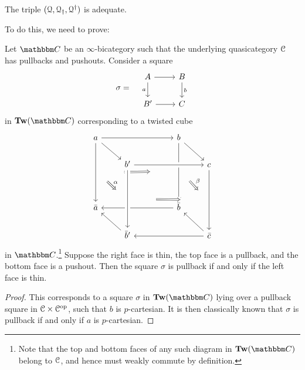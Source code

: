 \documentclass[main.tex]{subfiles}
\begin{document}
\begin{proposition}
  \label{prop:q_triple_is_adequate}
  The triple $(\mathcal{Q}, \mathcal{Q}_{\dagger}, \mathcal{Q}^{\dagger})$ is adequate.
\end{proposition}

To do this, we need to prove:
\begin{lemma}
  \label{lemma:pullbacks_in_ttw}
  Let $\CC$ be an $\infty$-bicategory such that the underlying quasicategory $\mathcal{C}$ has pullbacks and pushouts. Consider a square
  \begin{equation*}
    \sigma =\quad
    \begin{tikzcd}
      A
      \arrow[r]
      \arrow[d, swap, "a"]
      & B
      \arrow[d, "b"]
      \\
      B'
      \arrow[r]
      & C
    \end{tikzcd}
  \end{equation*}
  in $\Tw(\CC)$ corresponding to a twisted cube
  \begin{equation*}
    \begin{tikzcd}
      a
      \arrow[rrr]
      \arrow[dr, ""{name=TL, right}]
      \arrow[ddd, ""{name=R1, right}]
      &&& b
      \arrow[ddd, ""{name=L2, left}, ""{name=R2, right}]
      \arrow[dr, ""{name=TR, left}]
      \arrow[from=R1, to=L2, Rightarrow, shorten=7ex]
      \\
      & b'
      \arrow[rrr, crossing over]
      &&& c
      \arrow[ddd, ""{name=L4, left}"]
      \\
      \\
      \bar{a}
      &&& \bar{b}
      \arrow[lll]
      \\
      & \bar{b}'
      \arrow[from=uuu, crossing over, ""{name=L3, left}, ""{name=R3, right}]
      \arrow[ul]
      &&& \bar{c}
      \arrow[lll]
      \arrow[ul]
      \arrow[from=R1, to=L3, Rightarrow, shorten=3ex, "\alpha"]
      \arrow[from=R3, to=L4, Rightarrow, crossing over, shorten=7ex]
      \arrow[from=R2, to=L4, Rightarrow, shorten=3ex, "\beta"]
    \end{tikzcd}
  \end{equation*}
  in $\CC$.\footnote{Note that the top and bottom faces of any such diagram in $\Tw(\CC)$ belong to $\mathcal{C}$, and hence must weakly commute by definition.} Suppose the right face is thin, the top face is a pullback, and the bottom face is a pushout. Then the square $\sigma$ is pullback if and only if the left face is thin.
\end{lemma}
\begin{proof}
  This corresponds to a square $\sigma$ in $\Tw(\CC)$ lying over a pullback square in $\mathcal{C} \times \mathcal{C}^{\mathrm{op}}$, such that $b$ is $p$-cartesian. It is then classically known that $\sigma$ is pullback if and only if $a$ is $p$-cartesian.
\end{proof}
\end{document}
